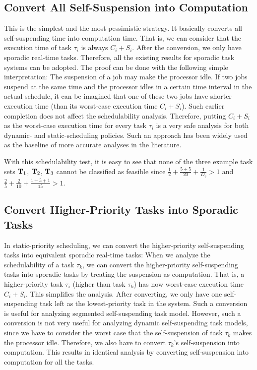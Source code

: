 \begin{table}[t]
\begin{table}[t]
\subsection{Convert All Self-Suspension into Computation}
 This is the simplest and the most pessimistic strategy. It basically converts all self-suspending time into computation time. That is, we can consider that the execution time of task $\tau_i$ is always $C_i+S_i$. After the conversion, we only have sporadic real-time tasks. Therefore, all the existing results for sporadic task systems can be adopted. The proof can be done with the following simple interpretation: The suspension of a job may make the processor idle. If two jobs suspend at the same time and the processor idles in a certain time interval in the actual schedule, it can be imagined that one of these two jobs have shorter execution time (than its worst-case execution time $C_i+S_i$). Such earlier completion does not affect the schedulability analysis. Therefore, putting $C_i+S_i$ as the worst-case execution time for every task $\tau_i$ is a very safe analysis for both dynamic- and static-scheduling policies.  Such an approach has been widely used as the baseline of more accurate analyses in the literature.

With this schedulability test, it is easy to see that none of the three example task sets ${\bf T}_1$, ${\bf T}_2$, ${\bf T}_3$ cannot be classified as feasible since $\frac{1}{2} + \frac{5+5}{20} + \frac{1}{D_\gamma} > 1$ and $\frac{2}{5}+\frac{2}{10}+\frac{1+5+1}{15} > 1$.

\subsection{Convert Higher-Priority Tasks into Sporadic Tasks} 

In static-priority scheduling, we can convert the higher-priority self-suspending tasks into equivalent sporadic real-time tasks: When we analyze the schedulability of a task $\tau_k$, we can convert the higher-priority self-suspending tasks into sporadic tasks by treating the suspension as computation. That is, a higher-priority task $\tau_i$ (higher than task $\tau_k$) has now worst-case execution time $C_i+S_i$. This simplifies the analysis. After converting, we only have one self-suspending task left as the lowest-priority task in the system.  Such a conversion is useful for analyzing segmented self-suspending task model. However, such a conversion is not very useful for analyzing dynamic self-suspending task models, since we have to consider the worst case that the self-suspension of task $\tau_k$ makes the processor idle. Therefore, we also have to convert $\tau_k$'s self-suspension into computation. This results in identical analysis by converting self-suspension into computation for all the tasks. 


\end{table}
\end{table}
